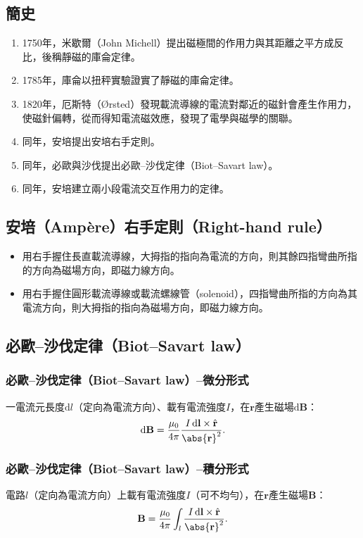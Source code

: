 \documentclass[a4paper,12pt]{report}
\begin{document}
\begin{itemize}
\subsection{簡史}
\begin{enumerate}
\item 1750年，米歇爾（John Michell）提出磁極間的作用力與其距離之平方成反比，後稱靜磁的庫侖定律。
\item 1785年，庫侖以扭秤實驗證實了靜磁的庫侖定律。
\item 1820年，厄斯特（Ørsted）發現載流導線的電流對鄰近的磁針會產生作用力，使磁針偏轉，從而得知電流磁效應，發現了電學與磁學的關聯。
\item 同年，安培提出安培右手定則。
\item 同年，必歐與沙伐提出必歐–沙伐定律（Biot–Savart law）。
\item 同年，安培建立兩小段電流交互作用力的定律。
\end{enumerate}
\subsection{安培（Ampère）右手定則（Right-hand rule）}
\begin{itemize}
\item 用右手握住長直載流導線，大拇指的指向為電流的方向，則其餘四指彎曲所指的方向為磁場方向，即磁力線方向。
\item 用右手握住圓形載流導線或載流螺線管（solenoid），四指彎曲所指的方向為其電流方向，則大拇指的指向為磁場方向，即磁力線方向。
\end{itemize}
\subsection{必歐–沙伐定律（Biot–Savart law）}
\subsubsection{必歐–沙伐定律（Biot–Savart law）–微分形式}
一電流元長度$\mathrm{d}l$（定向為電流方向）、載有電流強度$I$，在$\mathbf{r}$產生磁場$\mathrm{d}\mathbf{B}$：
\[\mathrm{d}\mathbf{B}=\frac{\mu_0}{4\pi}\frac{I\,\mathrm{d}\mathbf{l}\times\hat{\mathbf{r}}}{\abs{\mathbf{r}}^2}.\]
\subsubsection{必歐–沙伐定律（Biot–Savart law）–積分形式}
電路$l$（定向為電流方向）上載有電流強度$I$（可不均勻），在$\mathbf{r}$產生磁場$\mathbf{B}$：
\[\mathbf{B}=\frac{\mu_0}{4\pi}\int_{l}\frac{I\,\mathrm{d}\mathbf{l}\times\hat{\mathbf{r}}}{\abs{\mathbf{r}}^2}.\]

\end{itemize}
\end{document}
